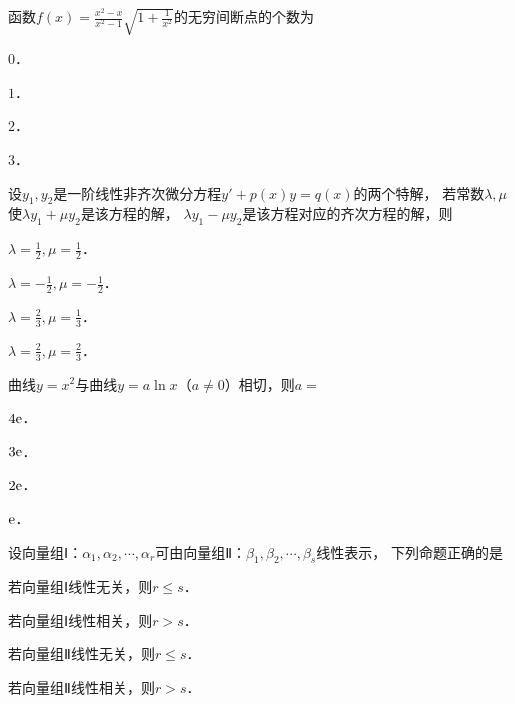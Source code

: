 \documentclass[plain,noanswer,medmath]{../../template/jnuexam}
\begin{document}






\begin{problem}
函数$f(x) = \frac{x^2 - x}{x^2 - 1}\sqrt{1 + \frac{1}{x^2}}$的无穷间断点的个数为\pickout{}
\begin{abcd}
\item $0$．
\item $1$．
\item $2$．
\item $3$．
\end{abcd}
\end{problem}


\begin{problem}
设$y_1,y_2$是一阶线性非齐次微分方程$y' + p(x)y = q(x)$的两个特解，
若常数$\lambda ,\mu$使$\lambda y_1 + \mu y_2$是该方程的解，
$\lambda y_1 - \mu y_2$是该方程对应的齐次方程的解，则\pickout{}
\begin{abcd}
\item $\lambda = \frac{1}{2},\mu = \frac{1}{2}$．
\item $\lambda = - \frac{1}{2},\mu = - \frac{1}{2}$．
\item $\lambda = \frac{2}{3},\mu = \frac{1}{3}$．
\item $\lambda = \frac{2}{3},\mu = \frac{2}{3}$．
\end{abcd}
\end{problem}


\begin{problem}
曲线$y = x^2$与曲线$y = a\ln x$（$a \ne 0$）相切，则$a =$\pickout{}
\begin{abcd}
\item $4\mathrm{e}$．
\item $3\mathrm{e}$．
\item $2\mathrm{e}$．
\item $\mathrm{e}$．
\end{abcd}
\end{problem}








\begin{problem}
设向量组Ⅰ：$\alpha_1,\alpha_2, \cdots ,\alpha_r$可由向量组Ⅱ：$\beta_1,\beta_2, \cdots ,\beta_s$线性表示，
下列命题正确的是\pickout{}
\begin{abcd}
\item 若向量组Ⅰ线性无关，则$r \le s$．
\item 若向量组Ⅰ线性相关，则$r > s$．
\item 若向量组Ⅱ线性无关，则$r \le s$．
\item 若向量组Ⅱ线性相关，则$r > s$．
\end{abcd}
\end{problem}
\end{document}
